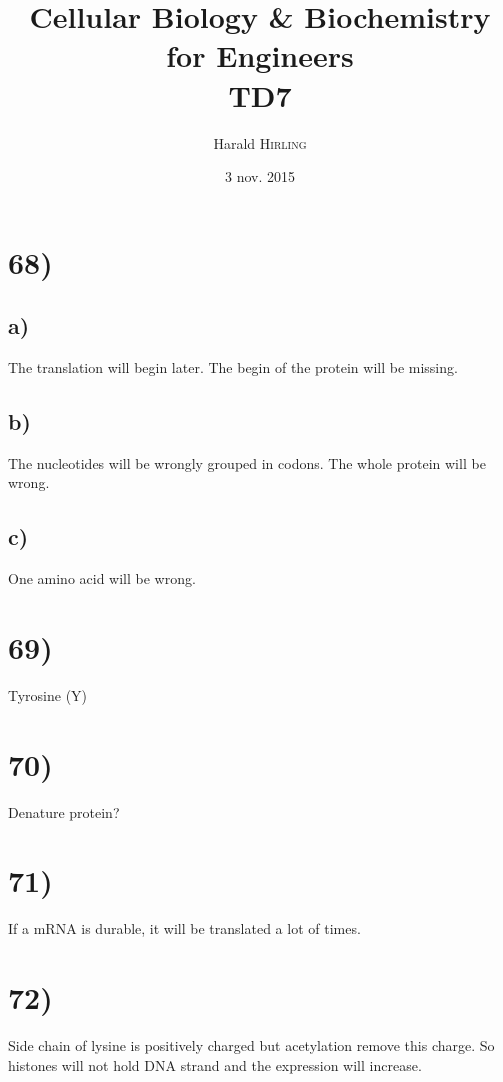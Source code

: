 

\title{Cellular Biology \& Biochemistry for Engineers\\TD7}
\author{Harald \textsc{Hirling}}
\date{3 nov. 2015}


\maketitle

\section*{68)}
\subsection*{a)}
The translation will begin later. The begin of the protein will be missing.

\subsection*{b)}
The nucleotides will be wrongly grouped in codons. The whole protein will be wrong.

\subsection*{c)}
One amino acid will be wrong.


\section*{69)}
Tyrosine (Y)

\section*{70)}
Denature protein?

\section*{71)}
If a mRNA is durable, it will be translated a lot of times.

\section*{72)}
Side chain of lysine is positively charged but acetylation remove this charge. So histones will not hold DNA strand and the expression will increase.

